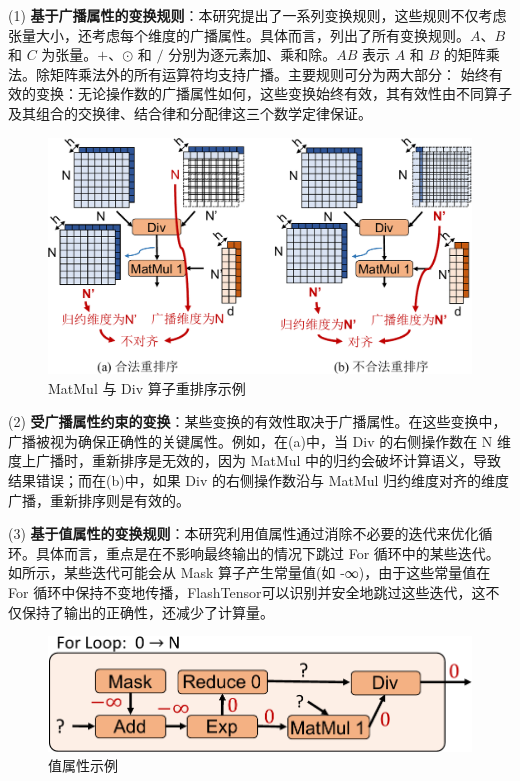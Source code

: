 (1) \textbf{基于广播属性的变换规则}：本研究提出了一系列变换规则，这些规则不仅考虑张量大小，还考虑每个维度的广播属性。具体而言，列出了所有变换规则。$A$、$B$ 和 $C$ 为张量。$+$、$\odot$ 和 $/$ 分别为逐元素加、乘和除。$AB$ 表示 $A$ 和 $B$ 的矩阵乘法。除矩阵乘法外的所有运算符均支持广播。主要规则可分为两大部分：
始终有效的变换：无论操作数的广播属性如何，这些变换始终有效，其有效性由不同算子及其组合的交换律、结合律和分配律这三个数学定律保证。

\begin{figure}[ht]
    \centering
    \includegraphics[width=0.75\linewidth]{figures/flashtensor/wo_broadcast-crop.pdf}
    \caption{MatMul 与 Div 算子重排序示例}
    \label{fig:wo_broadcast}
\end{figure}

(2) \textbf{受广播属性约束的变换}：某些变换的有效性取决于广播属性。在这些变换中，广播被视为确保正确性的关键属性。例如，在(a)中，当 Div 的右侧操作数在 N 维度上广播时，重新排序是无效的，因为 MatMul 中的归约会破坏计算语义，导致结果错误；而在(b)中，如果 Div 的右侧操作数沿与 MatMul 归约维度对齐的维度广播，重新排序则是有效的。

(3) \textbf{基于值属性的变换规则}：本研究利用值属性通过消除不必要的迭代来优化循环。具体而言，重点是在不影响最终输出的情况下跳过 For 循环中的某些迭代。如所示，某些迭代可能会从 Mask 算子产生常量值(如 -∞)，由于这些常量值在 For 循环中保持不变地传播，FlashTensor可以识别并安全地跳过这些迭代，这不仅保持了输出的正确性，还减少了计算量。

\begin{figure}[ht]
    \centering
    \includegraphics[width=0.5\linewidth]{figures/flashtensor/value_example-crop.pdf}
    \caption{值属性示例}
    \label{fig:value_example}
\end{figure}


